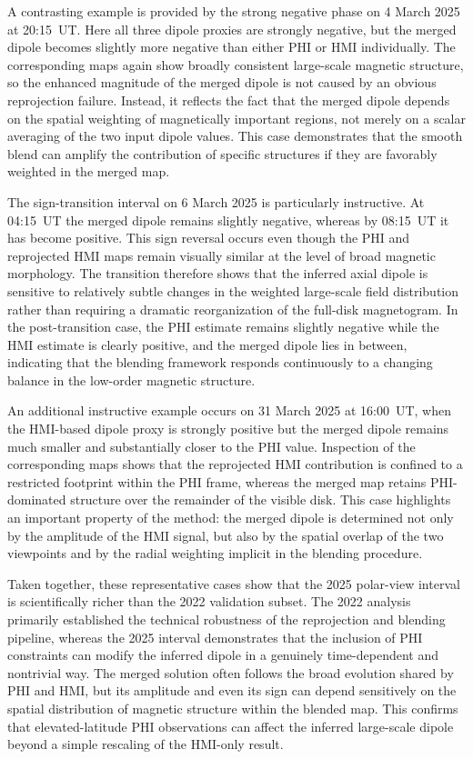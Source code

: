 \documentclass[namedreferences,hyperref,optionalrh]{spr-sola}
\begin{document}
A contrasting example is provided by the strong negative phase on 4 March 2025 at 20:15~UT. Here all three dipole proxies are strongly negative, but the merged dipole becomes slightly more negative than either PHI or HMI individually. The corresponding maps again show broadly consistent large-scale magnetic structure, so the enhanced magnitude of the merged dipole is not caused by an obvious reprojection failure. Instead, it reflects the fact that the merged dipole depends on the spatial weighting of magnetically important regions, not merely on a scalar averaging of the two input dipole values. This case demonstrates that the smooth blend can amplify the contribution of specific structures if they are favorably weighted in the merged map.

The sign-transition interval on 6 March 2025 is particularly instructive. At 04:15~UT the merged dipole remains slightly negative, whereas by 08:15~UT it has become positive. This sign reversal occurs even though the PHI and reprojected HMI maps remain visually similar at the level of broad magnetic morphology. The transition therefore shows that the inferred axial dipole is sensitive to relatively subtle changes in the weighted large-scale field distribution rather than requiring a dramatic reorganization of the full-disk magnetogram. In the post-transition case, the PHI estimate remains slightly negative while the HMI estimate is clearly positive, and the merged dipole lies in between, indicating that the blending framework responds continuously to a changing balance in the low-order magnetic structure.

An additional instructive example occurs on 31 March 2025 at 16:00~UT, when the HMI-based dipole proxy is strongly positive but the merged dipole remains much smaller and substantially closer to the PHI value. Inspection of the corresponding maps shows that the reprojected HMI contribution is confined to a restricted footprint within the PHI frame, whereas the merged map retains PHI-dominated structure over the remainder of the visible disk. This case highlights an important property of the method: the merged dipole is determined not only by the amplitude of the HMI signal, but also by the spatial overlap of the two viewpoints and by the radial weighting implicit in the blending procedure.

Taken together, these representative cases show that the 2025 polar-view interval is scientifically richer than the 2022 validation subset. The 2022 analysis primarily established the technical robustness of the reprojection and blending pipeline, whereas the 2025 interval demonstrates that the inclusion of PHI constraints can modify the inferred dipole in a genuinely time-dependent and nontrivial way. The merged solution often follows the broad evolution shared by PHI and HMI, but its amplitude and even its sign can depend sensitively on the spatial distribution of magnetic structure within the blended map. This confirms that elevated-latitude PHI observations can affect the inferred large-scale dipole beyond a simple rescaling of the HMI-only result.
\end{document}
